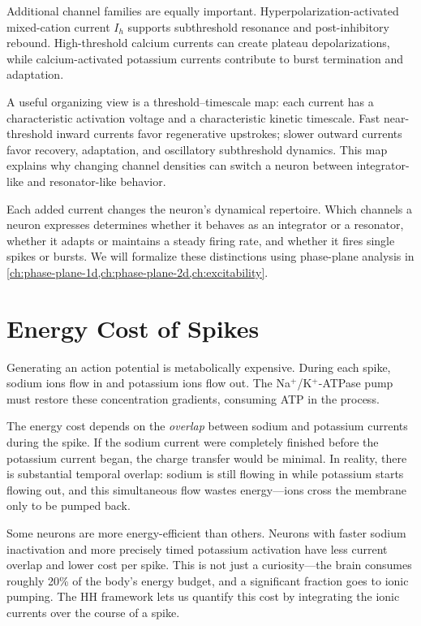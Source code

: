 Additional channel families are equally important. Hyperpolarization-activated mixed-cation current $I_h$ supports subthreshold resonance and post-inhibitory rebound. High-threshold calcium currents can create plateau depolarizations, while calcium-activated potassium currents contribute to burst termination and adaptation.

A useful organizing view is a threshold--timescale map: each current has a characteristic activation voltage and a characteristic kinetic timescale. Fast near-threshold inward currents favor regenerative upstrokes; slower outward currents favor recovery, adaptation, and oscillatory subthreshold dynamics. This map explains why changing channel densities can switch a neuron between integrator-like and resonator-like behavior.

Each added current changes the neuron's dynamical repertoire. Which channels a neuron expresses determines whether it behaves as an integrator or a resonator, whether it adapts or maintains a steady firing rate, and whether it fires single spikes or bursts. We will formalize these distinctions using phase-plane analysis in \cref{ch:phase-plane-1d,ch:phase-plane-2d,ch:excitability}.

\section{Energy Cost of Spikes}
\label{sec:energy-cost}

Generating an action potential is metabolically expensive. During each spike, sodium ions flow in and potassium ions flow out. The Na$^+$/K$^+$-ATPase pump must restore these concentration gradients, consuming ATP in the process.

The energy cost depends on the \emph{overlap} between sodium and potassium currents during the spike. If the sodium current were completely finished before the potassium current began, the charge transfer would be minimal. In reality, there is substantial temporal overlap: sodium is still flowing in while potassium starts flowing out, and this simultaneous flow wastes energy---ions cross the membrane only to be pumped back.

Some neurons are more energy-efficient than others. Neurons with faster sodium inactivation and more precisely timed potassium activation have less current overlap and lower cost per spike. This is not just a curiosity---the brain consumes roughly 20\% of the body's energy budget, and a significant fraction goes to ionic pumping. The HH framework lets us quantify this cost by integrating the ionic currents over the course of a spike.

